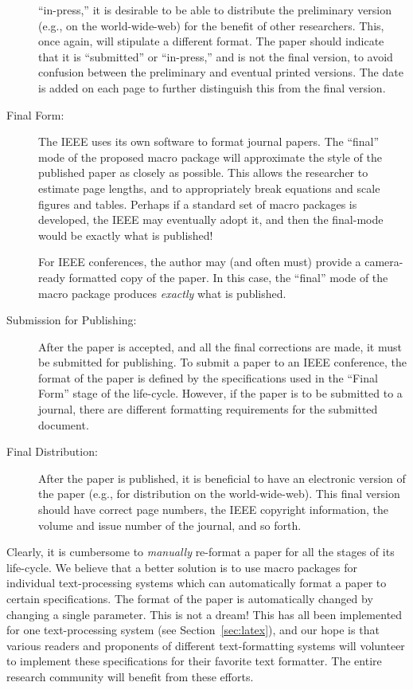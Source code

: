 \documentclass[%
	final,
	notitlepage,
	narroweqnarray,
	inline,
	twoside,
	]{ieee}
\begin{document}
\begin{description}
    ``in-press,'' it is desirable to be able to distribute the 
    preliminary version (e.g., on the world-wide-web) for the 
    benefit of other researchers. This, once again, will stipulate a 
    different format. The paper should indicate that it is
    ``submitted'' or ``in-press,'' and is not the final version, to 
    avoid confusion between the preliminary and eventual printed
    versions. The date is added on each page to further distinguish this
    from the final version.
\item[Final Form:] The IEEE uses its own software to format journal
    papers. The ``final'' mode of the proposed macro package will
    approximate the style of the published paper as closely as possible.
    This allows the researcher to estimate page lengths, and to 
    appropriately break equations and scale figures and tables. Perhaps 
    if a standard set of macro packages is developed, the IEEE may 
    eventually adopt it, and then the final-mode would be exactly 
    what is published!

    For IEEE conferences, the author may (and often must) provide a
    camera-ready formatted copy of the paper. In this case, the 
    ``final'' mode of the macro package produces \emph{exactly} what 
    is published.
\item[Submission for Publishing:] After the paper is accepted,
    and all the final corrections are made, it must be submitted for 
    publishing. To submit a paper to an IEEE conference, the format of 
    the paper is defined by the specifications used in the ``Final Form'' 
    stage of the life-cycle. However, if the paper is to be submitted
    to a journal, there are different formatting requirements for the
    submitted document.
\item[Final Distribution:] After the paper is published, it is
    beneficial to have an electronic version of the paper
    (e.g., for distribution on the world-wide-web). This final
    version should have correct page numbers, the IEEE copyright 
    information, the volume and issue number of the journal, and so forth.
\end{description}

Clearly, it is cumbersome to \emph{manually} re-format a paper for all
the stages of its life-cycle. We believe that a better solution is to
use macro packages for individual text-processing systems which can
automatically format a paper to certain specifications.  The format of
the paper is automatically changed by changing a single parameter.
This is not a dream! This has all been implemented for one
text-processing system (see Section~\ref{sec:latex}), and our hope is
that various readers and proponents of different text-formatting
systems will volunteer to implement these specifications for their
favorite text formatter. The entire research community will benefit
from these efforts.
\end{document}
